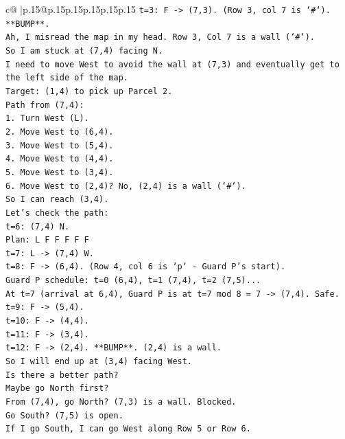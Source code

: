 \documentclass{article}
\begin{document}
{\begin{supertabular}{c@{$\;$}|p{.15\linewidth}@{}p{.15\linewidth}p{.15\linewidth}p{.15\linewidth}p{.15\linewidth}p{.15\linewidth}}
{{{\texttt{t=3: F {-}> (7,3). (Row 3, col 7 is `\#`). **BUMP**.} \\
\texttt{Ah, I misread the map in my head. Row 3, Col 7 is a wall (`\#`).} \\
\texttt{So I am stuck at (7,4) facing N.} \\
\texttt{I need to move West to avoid the wall at (7,3) and eventually get to the left side of the map.} \\
\texttt{Target: (1,4) to pick up Parcel 2.} \\
\texttt{Path from (7,4):} \\
\texttt{1. Turn West (L).} \\
\texttt{2. Move West to (6,4).} \\
\texttt{3. Move West to (5,4).} \\
\texttt{4. Move West to (4,4).} \\
\texttt{5. Move West to (3,4).} \\
\texttt{6. Move West to (2,4)? No, (2,4) is a wall (`\#`).} \\
\texttt{So I can reach (3,4).} \\
\texttt{Let's check the path:} \\
\texttt{t=6: (7,4) N.} \\
\texttt{Plan: L F F F F F} \\
\texttt{t=7: L {-}> (7,4) W.} \\
\texttt{t=8: F {-}> (6,4). (Row 4, col 6 is `p` {-} Guard P's start).} \\
\texttt{Guard P schedule: t=0 (6,4), t=1 (7,4), t=2 (7,5)...} \\
\texttt{At t=7 (arrival at 6,4), Guard P is at t=7 mod 8 = 7 {-}> (7,4). Safe.} \\
\texttt{t=9: F {-}> (5,4).} \\
\texttt{t=10: F {-}> (4,4).} \\
\texttt{t=11: F {-}> (3,4).} \\
\texttt{t=12: F {-}> (2,4). **BUMP**. (2,4) is a wall.} \\
\texttt{So I will end up at (3,4) facing West.} \\
\texttt{Is there a better path?} \\
\texttt{Maybe go North first?} \\
\texttt{From (7,4), go North? (7,3) is a wall. Blocked.} \\
\texttt{Go South? (7,5) is open.} \\
\texttt{If I go South, I can go West along Row 5 or Row 6.} \\
}}}
\end{supertabular}}
\end{document}
